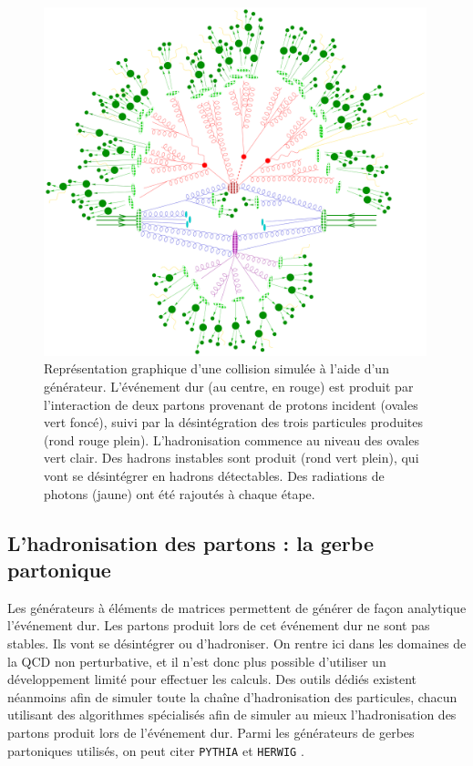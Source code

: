 \begin{figure}[htbp]
    \centering
    \includegraphics[width=0.99\textwidth]{chapitre3/figs/parton_shower.pdf}
    \caption{Représentation graphique d'une collision simulée à l'aide d'un générateur. L'événement dur (au centre, en rouge) est produit par l'interaction de deux partons provenant de protons incident (ovales vert foncé), suivi par la désintégration des trois particules produites (rond rouge plein). L'hadronisation commence au niveau des ovales vert clair. Des hadrons instables sont produit (rond vert plein), qui vont se désintégrer en hadrons détectables. Des radiations de photons (jaune) ont été rajoutés à chaque étape.}
    \label{fig:parton_shower}
\end{figure}

\subsection{L'hadronisation des partons : la gerbe partonique}

Les générateurs à éléments de matrices permettent de générer de façon analytique l'événement dur. Les partons produit lors de cet événement dur ne sont pas stables. Ils vont se désintégrer ou d'hadroniser. On rentre ici dans les domaines de la QCD non perturbative, et il n'est donc plus possible d'utiliser un développement limité pour effectuer les calculs. Des outils dédiés existent néanmoins afin de simuler toute la chaîne d'hadronisation des particules, chacun utilisant des algorithmes spécialisés afin de simuler au mieux l'hadronisation des partons produit lors de l'événement dur. Parmi les générateurs de gerbes partoniques utilisés, on peut citer \texttt{PYTHIA} \citep{pythia} et \texttt{HERWIG} \citep{Corcella:2000bw}.

